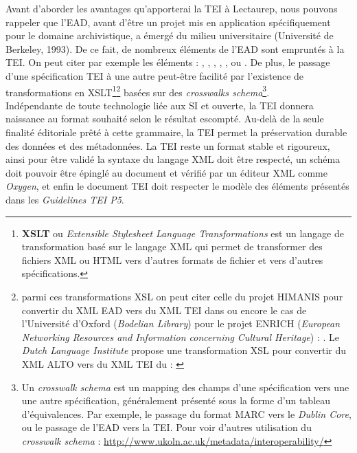 Avant d'aborder les avantages qu'apporterai la TEI à Lectaurep, nous pouvons rappeler que l'EAD, avant d'être un projet mis en application spécifiquement pour le domaine archivistique, a émergé du milieu universitaire (Université de Berkeley, 1993). De ce fait, de nombreux éléments de l'EAD sont empruntés à la TEI. On peut citer par exemple les éléments  : , , , , , ou .
De plus, le passage d'une spécification TEI à une autre peut-être facilité par l'existence de transformations en XSLT\footnote{\textbf{XSLT} ou \textit{Extensible Stylesheet Language Transformations} est un langage de transformation basé sur le langage XML qui permet de transformer des fichiers XML ou HTML vers d'autres formats de fichier et vers d'autres spécifications.}\footnote{parmi ces transformations XSL on peut citer celle du projet HIMANIS pour convertir du XML EAD vers du XML TEI dans \cite{stutzmann_ead-tei_2019} ou encore le cas de l'Université d'Oxford (\textit{Bodelian Library}) pour le projet ENRICH (\textit{European Networking Resources and Information concerning Cultural Heritage}) : \cite{noauthor_ead2enrich_nodate}. Le \textit{Dutch Language Institute} propose une transformation XSL pour convertir du XML ALTO vers du XML TEI du : \cite{noauthor_alto2tei_nodate}} basées sur des \textit{crosswalks schema}\footnote{Un \textit{crosswalk schema} est un mapping des champs d'une spécification vers une une autre spécification, généralement présenté sous la forme d'un tableau d'équivalences. Par exemple, le passage du format MARC vers le \textit{Dublin Core}, ou le passage de l'EAD vers la TEI. Pour voir d'autres utilisation du \textit{crosswalk schema} : \url{http://www.ukoln.ac.uk/metadata/interoperability/}}.\\ 
 
Indépendante de toute technologie liée aux SI et ouverte, la TEI donnera naissance au format souhaité selon le résultat escompté. Au-delà de la seule finalité éditoriale prêté à cette grammaire, la TEI permet la préservation durable des données et des métadonnées. La TEI reste un format stable et rigoureux, ainsi pour être validé la syntaxe du langage XML doit être respecté, un schéma doit pouvoir être épinglé au document et vérifié par un éditeur XML comme \textit{Oxygen}, et enfin le document TEI doit respecter le modèle des éléments présentés dans les \textit{Guidelines TEI P5}.

